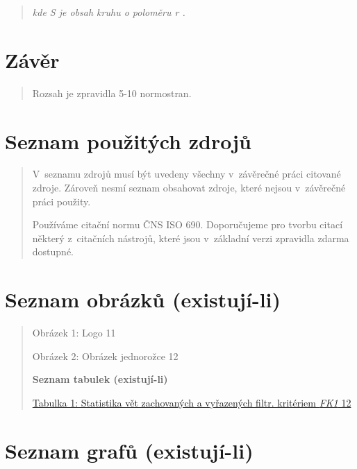 \documentclass[
]{article}
\begin{document}
\begin{quote}
  \emph{kde S je obsah kruhu o poloměru r .}
\end{quote}

\newpage
\hypertarget{zuxe1vux11br}{%
  \section{Závěr}\label{zuxe1vux11br}}

\begin{quote}
  Rozsah je zpravidla 5-10 normostran.
\end{quote}

\newpage
\hypertarget{seznam-pouux17eituxfdch-zdrojux16f}{%
  \section{Seznam použitých
    zdrojů}\label{seznam-pouux17eituxfdch-zdrojux16f}}

\begin{quote}
  V~seznamu zdrojů musí být uvedeny všechny v~závěrečné práci citované
  zdroje. Zároveň nesmí seznam obsahovat zdroje, které nejsou v~závěrečné
  práci použity.

  Používáme citační normu ČNS ISO 690. Doporučujeme pro tvorbu citací
  některý z~citačních nástrojů, které jsou v~základní verzi zpravidla
  zdarma dostupné.
\end{quote}

\newpage
\hypertarget{seznam-obruxe1zkux16f-existujuxed-li}{%
  \section{Seznam obrázků
    (existují-li)}\label{seznam-obruxe1zkux16f-existujuxed-li}}

\begin{quote}
  Obrázek 1: Logo 11

  Obrázek 2: Obrázek jednorožce 12

  \newpage
  \textbf{Seznam tabulek (existují-li)}

  \protect\hyperlink{_bookmark9}{Tabulka 1: Statistika vět zachovaných a
    vyřazených filtr. kritériem \emph{FK1} 12}
\end{quote}

\newpage
\hypertarget{seznam-grafux16f-existujuxed-li}{%
  \section{Seznam grafů
    (existují-li)}\label{seznam-grafux16f-existujuxed-li}}
\end{document}
